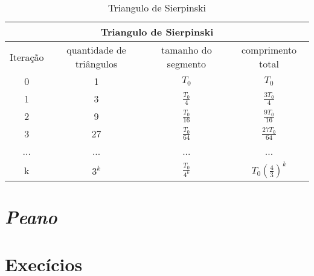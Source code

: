 {\renewcommand{\arraystretch}{1.5}
\begin{table}[h]

    \centering
        \begin{tabular}{| c | c | c | c |}
             \multicolumn{4}{c}{Triangulo de Sierpinski} \\
             \hline
             Iteração & quantidade de triângulos & tamanho do segmento & comprimento total\\
             \hline
             0 & 1 & $ T_0 $ & $ T_0 $ \\
             \hline
             1 & 3 & $ \frac{ T_0 }{4} $ & $\frac{ 3T_{0} }{4}$ \\
             \hline
             2 & 9 & $ \frac{ T_{0} }{16} $ & $\frac{ 9T_0}{16}$ \\
             \hline 
             3 & 27 & $ \frac{ T_{0} }{64} $ & $\frac{ 27T_0}{64}$ \\
             \hline
             ... & ... & ... & ... \\
             \hline
             k & $3^k$ & $ \frac{ T_{0} }{4^k} $ & $ T_0(\frac{4}{3})^k $ \\
             \hline
        \end{tabular}
    \caption{Triangulo de Sierpinski}
    \label{tab:msier}
\end{table}}


\section{\textit{Peano}}

\section{Execícios}